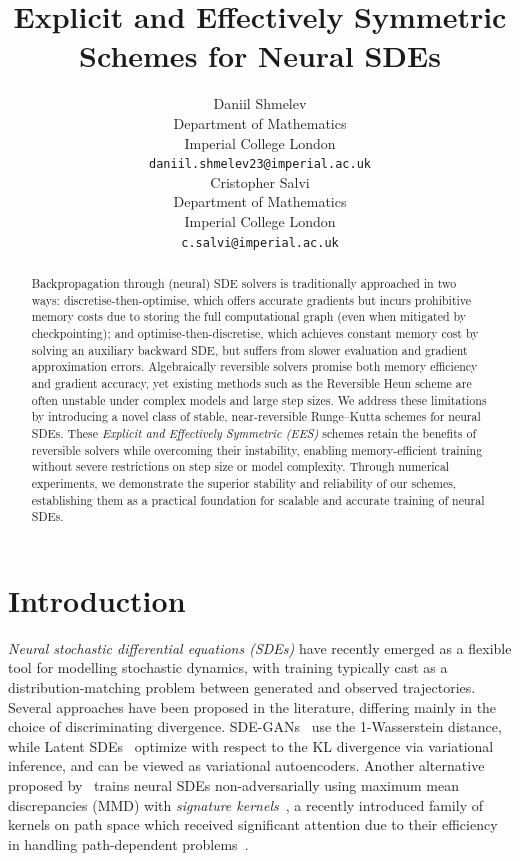 \documentclass{article} %
\title{Explicit and Effectively Symmetric Schemes for Neural SDEs}
\author{%
  Daniil Shmelev\\
  Department of Mathematics\\
  Imperial College London\\
  \texttt{daniil.shmelev23@imperial.ac.uk} \\
  \And
  Cristopher Salvi\\
  Department of Mathematics\\
  Imperial College London\\
  \texttt{c.salvi@imperial.ac.uk} \\
}
\theoremstyle{definition}
\theoremstyle{remark}
\begin{document}
\maketitle

\makeatletter
{}
\makeatother


\begin{abstract}
  Backpropagation through (neural) SDE solvers is traditionally approached in two ways: discretise-then-optimise, which offers accurate gradients but incurs prohibitive memory costs due to storing the full computational graph (even when mitigated by checkpointing); and optimise-then-discretise, which achieves constant memory cost by solving an auxiliary backward SDE, but suffers from slower evaluation and gradient approximation errors. Algebraically reversible solvers promise both memory efficiency and gradient accuracy, yet existing methods such as the Reversible Heun scheme are often unstable under complex models and large step sizes. We address these limitations by introducing a novel class of stable, near-reversible Runge–Kutta schemes for neural SDEs. These \emph{Explicit and Effectively Symmetric (EES)} schemes retain the benefits of reversible solvers while overcoming their instability, enabling memory-efficient training without severe restrictions on step size or model complexity. Through numerical experiments, we demonstrate the superior stability and reliability of our schemes, establishing them as a practical foundation for scalable and accurate training of neural SDEs.
\end{abstract}


\section{Introduction}

\emph{Neural stochastic differential equations (SDEs)} have recently emerged as a flexible tool for modelling stochastic dynamics, with training typically cast as a distribution-matching problem between generated and observed trajectories. Several approaches have been proposed in the literature, differing mainly in the choice of discriminating divergence. SDE-GANs~\citep{kidger2021neural} use the 1-Wasserstein distance, while Latent SDEs~\citep{li2020scalable} optimize with respect to the KL divergence via variational inference, and can be viewed as variational autoencoders. Another alternative proposed by~\cite{issa2023non} trains neural SDEs non-adversarially using maximum mean discrepancies (MMD) with \emph{signature kernels}~\citep{kiraly2019kernels, salvi2021signature, lemercier2024log}, a recently introduced family of kernels on path space which received significant attention due to their efficiency in handling path-dependent problems~\citep{salvi2021higher, lemercier2021distribution, pannier2024path, cirone2025rough}.
\end{document}
